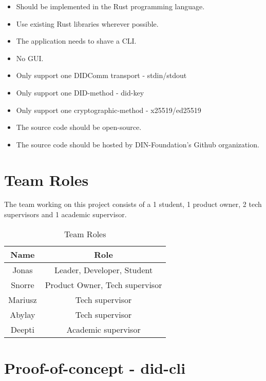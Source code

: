 \begin{itemize}
    \item Should be implemented in the Rust programming language.
    \item Use existing Rust libraries wherever possible.
    \item The application needs to shave a CLI.
    \item No GUI.
    \item Only support one DIDComm transport - stdin/stdout
    \item Only support one DID-method - did-key
    \item Only support one cryptographic-method - x25519/ed25519
    \item The source code should be open-source.
    \item The source code should be hosted by \acrshort{DIN}-Foundation's Github organization.
\end{itemize}



\newpage

\section{Team Roles}

The team working on this project consists of a 1 student, 1 product owner, 2 tech supervisors and 1 academic supervisor.

\begin{table}
  \centering
  \caption{Team Roles}
  \label{tab:example1}
  \begin{tabular}{cc}
    \hline
    Name  & Role \\
    \hline
    Jonas       & Leader, Developer, Student         \\
    Snorre      & Product Owner, Tech supervisor \\
    Mariusz     & Tech supervisor \\
    Abylay      & Tech supervisor \\
    Deepti      & Academic supervisor \\
    \hline
  \end{tabular}
\end{table}



\newpage

\section{Proof-of-concept - \acrshort{did-cli}}

